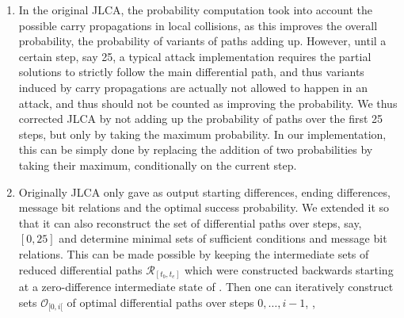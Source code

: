 \begin{enumerate}
\item In the original JLCA,
the probability computation took into account the possible carry propagations in local collisions,
as this improves the overall probability, the probability of variants of paths adding up. 
However, until a certain step, say 25, a typical attack implementation requires the partial solutions to strictly follow the main differential path,
and thus variants induced by carry propagations are actually not allowed to happen in an attack, and thus should not be counted as improving the probability.
We thus corrected JLCA by not adding up the probability of paths over the first 25 steps, but only by taking the maximum probability. 
In our implementation, this can be simply done by replacing the addition of two probabilities by taking their maximum, conditionally on the current \shaone step.
\item Originally JLCA only gave as output starting differences, ending differences, message bit relations and the optimal success probability. 
We extended it so that it can also reconstruct the set of differential paths over steps, say, $[0,25]$ and determine minimal sets of sufficient conditions and message bit relations.
This can be made possible by keeping the intermediate sets of reduced differential paths $\mathcal{R}_{[t_b,t_e]}$ which were constructed backwards starting at a zero-difference intermediate state of \shaone.
Then one can iteratively construct sets $\mathcal{O}_{[0,i[}$ of optimal differential paths over steps $0,\ldots,i-1$, \ie,

\end{enumerate}
